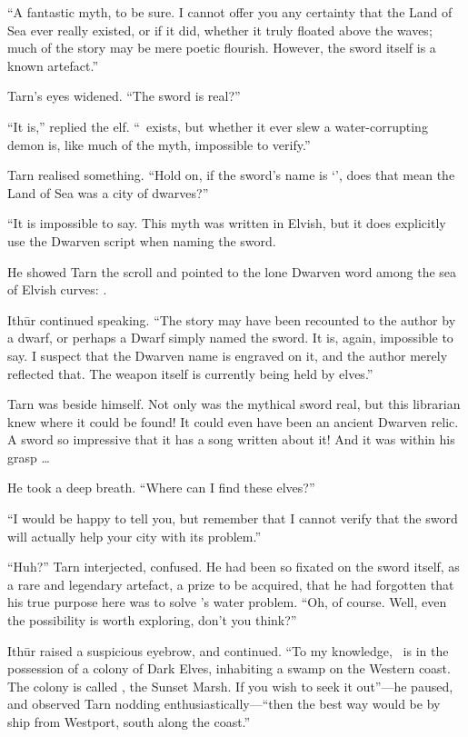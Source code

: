``A fantastic myth, to be sure.  I cannot offer you any certainty that the Land of Sea ever really existed, or if it did, whether it truly floated above the waves; much of the story may be mere poetic flourish.  However, the sword itself is a known artefact.''

Tarn's eyes widened.  ``The sword is real?''

``It is,'' replied the elf.  ``\kildir\ exists, but whether it ever slew a water-corrupting demon is, like much of the myth, impossible to verify.''

Tarn realised something.  ``Hold on, if the sword's name is `\kildir', does that mean the Land of Sea was a city of dwarves?''

``It is impossible to say.  This myth was written in Elvish, but it does explicitly use the Dwarven script when naming the sword.

He showed Tarn the scroll and pointed to the lone Dwarven word among the sea of Elvish curves: \dwarven{\kildir}.

Ith\=ur continued speaking.  ``The story may have been recounted to the author by a dwarf, or perhaps a Dwarf simply named the sword.  It is, again, impossible to say.  I suspect that the Dwarven name is engraved on it, and the author merely reflected that.  The weapon itself is currently being held by elves.''

Tarn was beside himself.  Not only was the mythical sword real, but this librarian knew where it could be found!  It could even have been an ancient Dwarven relic.  A sword so impressive that it has a song written about it!  And it was within his grasp \ldots

He took a deep breath.  ``Where can I find these elves?''

``I would be happy to tell you, but remember that I cannot verify that the sword will actually help your city with its problem.''

``Huh?'' Tarn interjected, confused.  He had been so fixated on the sword itself, as a rare and legendary artefact, a prize to be acquired, that he had forgotten that his true purpose here was to solve \korbarthrond's water problem.  ``Oh, of course.  Well, even the possibility is worth exploring, don't you think?''

Ith\=ur raised a suspicious eyebrow, and continued.  ``To my knowledge, \kildir\ is in the possession of a colony of Dark Elves, inhabiting a swamp on the Western coast.  The colony is called \yedmurdim, the Sunset Marsh.  If you wish to seek it out''---he paused, and observed Tarn nodding enthusiastically---``then the best way would be by ship from Westport, south along the coast.''

